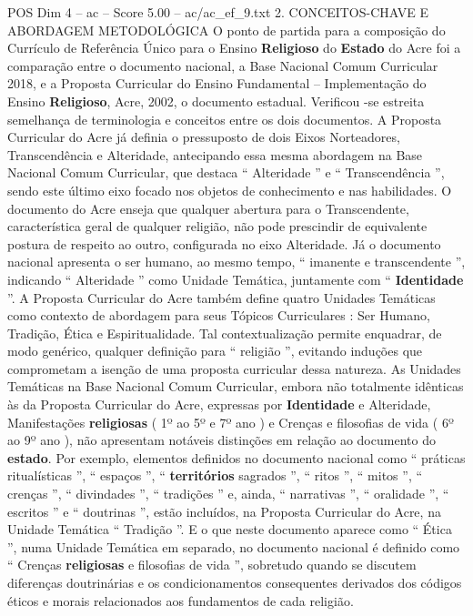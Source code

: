 \begin{textsample}{POS Dim 4 – ac – Score 5.00 – ac/ac\_ef\_9.txt}  \label{ex:f4_pos_249}
2.
CONCEITOS-CHAVE E ABORDAGEM METODOLÓGICA O ponto de partida para a composição do Currículo de Referência Único para o Ensino \textbf{Religioso} do \textbf{Estado} do Acre foi a comparação entre o documento nacional, a Base Nacional Comum Curricular 2018, e a Proposta Curricular do Ensino Fundamental – Implementação do Ensino \textbf{Religioso}, Acre, 2002, o documento estadual.
Verificou -se estreita semelhança de terminologia e conceitos entre os dois documentos.
A Proposta Curricular do Acre já definia o pressuposto de dois Eixos Norteadores, Transcendência e Alteridade, antecipando essa mesma abordagem na Base Nacional Comum Curricular, que destaca “ Alteridade ” e “ Transcendência ”, sendo este último eixo focado nos objetos de conhecimento e nas habilidades.
O documento do Acre enseja que qualquer abertura para o Transcendente, característica geral de qualquer religião, não pode prescindir de equivalente postura de respeito ao outro, configurada no eixo Alteridade.
Já o documento nacional apresenta o ser humano, ao mesmo tempo, “ imanente e transcendente ”, indicando “ Alteridade ” como Unidade Temática, juntamente com “ \textbf{Identidade} ”.
A Proposta Curricular do Acre também define quatro Unidades Temáticas como contexto de abordagem para seus Tópicos Curriculares : Ser Humano, Tradição, Ética e Espiritualidade.
Tal contextualização permite enquadrar, de modo genérico, qualquer definição para “ religião ”, evitando induções que comprometam a isenção de uma proposta curricular dessa natureza.
As Unidades Temáticas na Base Nacional Comum Curricular, embora não totalmente idênticas às da Proposta Curricular do Acre, expressas por \textbf{Identidade} e Alteridade, Manifestações \textbf{religiosas} ( 1º ao 5º e 7º ano ) e Crenças e filosofias de vida ( 6º ao 9º ano ), não apresentam notáveis distinções em relação ao documento do \textbf{estado}.
Por exemplo, elementos definidos no documento nacional como “ práticas ritualísticas ”, “ espaços ”, “ \textbf{territórios} sagrados ”, “ ritos ”, “ mitos ”, “ crenças ”, “ divindades ”, “ tradições ” e, ainda, “ narrativas ”, “ oralidade ”, “ escritos ” e “ doutrinas ”, estão incluídos, na Proposta Curricular do Acre, na Unidade Temática “ Tradição ”.
E o que neste documento aparece como “ Ética ”, numa Unidade Temática em separado, no documento nacional é definido como “ Crenças \textbf{religiosas} e filosofias de vida ”, sobretudo quando se discutem diferenças doutrinárias e os condicionamentos consequentes derivados dos códigos éticos e morais relacionados aos fundamentos de cada religião.

\end{textsample}
